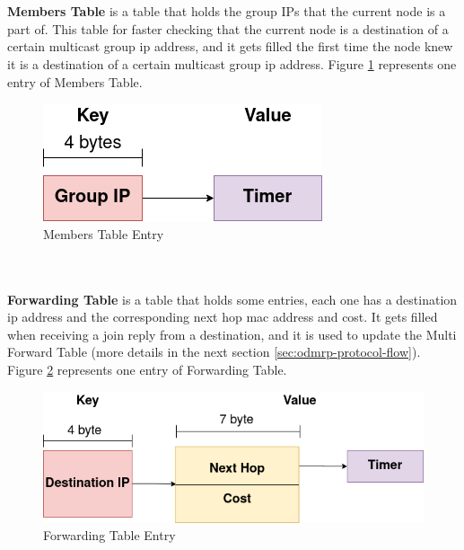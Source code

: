 \\
\\
\textbf{Members Table} is a table that holds the group IPs that the current node is a part of. This table for faster checking that the current node is a destination of a certain multicast group \acrshort{ip} address, and it gets filled the first time the node knew it is a destination of a certain multicast group \acrshort{ip} address. Figure \ref{fig:member-table-entry} represents one entry of Members Table.
\begin{figure}[!htbp]
    \centering
    \includegraphics[scale=0.8]{images/member-table-entry.png}
    \caption{Members Table Entry}
    \label{fig:member-table-entry}
\end{figure}
\\
\\
\textbf{Forwarding Table} is a table that holds some entries, each one has a destination \acrshort{ip} address and the corresponding next hop \acrshort{mac} address and cost. It gets filled when receiving a join reply from a destination, and it is used to update the Multi Forward Table (more details in the next section \ref{sec:odmrp-protocol-flow}).
Figure \ref{fig:forwarding-table-entry} represents one entry of Forwarding Table.

\begin{figure}[!htbp]
    \centering
    \includegraphics[width=\linewidth]{images/forwarding-table-entry.png}
    \caption{Forwarding Table Entry}
    \label{fig:forwarding-table-entry}
\end{figure}

